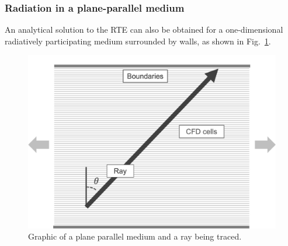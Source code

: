 \subsubsection{Radiation in a plane-parallel medium}
An analytical solution to the RTE can also be obtained for a one-dimensional radiatively participating medium surrounded by walls, as shown in Fig.~\ref{fig:PlaneParallel}.
\begin{figure}
\centering
\includegraphics[width=0.5\linewidth]{figures/ch2/PlaneParallelVisualization.png}
\caption{Graphic of a plane parallel medium and a ray being traced. }
\label{fig:PlaneParallel}
\end{figure}

